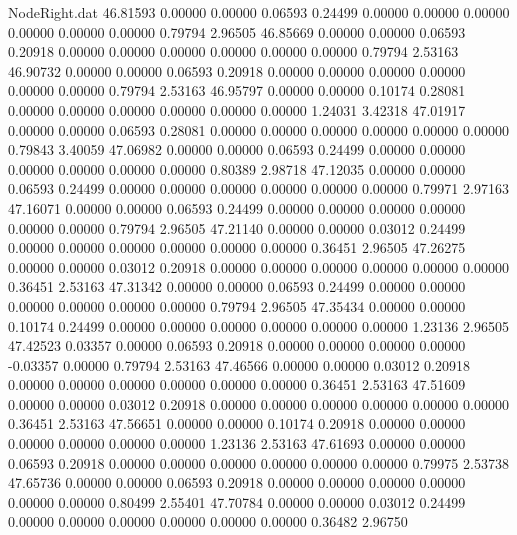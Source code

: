 \begin{filecontents}{NodeRight.dat}
  46.81593    0.00000    0.00000     0.06593    0.24499    0.00000    0.00000    0.00000    0.00000    0.00000    0.00000    0.79794    2.96505
  46.85669    0.00000    0.00000     0.06593    0.20918    0.00000    0.00000    0.00000    0.00000    0.00000    0.00000    0.79794    2.53163
  46.90732    0.00000    0.00000     0.06593    0.20918    0.00000    0.00000    0.00000    0.00000    0.00000    0.00000    0.79794    2.53163
  46.95797    0.00000    0.00000     0.10174    0.28081    0.00000    0.00000    0.00000    0.00000    0.00000    0.00000    1.24031    3.42318
  47.01917    0.00000    0.00000     0.06593    0.28081    0.00000    0.00000    0.00000    0.00000    0.00000    0.00000    0.79843    3.40059
  47.06982    0.00000    0.00000     0.06593    0.24499    0.00000    0.00000    0.00000    0.00000    0.00000    0.00000    0.80389    2.98718
  47.12035    0.00000    0.00000     0.06593    0.24499    0.00000    0.00000    0.00000    0.00000    0.00000    0.00000    0.79971    2.97163
  47.16071    0.00000    0.00000     0.06593    0.24499    0.00000    0.00000    0.00000    0.00000    0.00000    0.00000    0.79794    2.96505
  47.21140    0.00000    0.00000     0.03012    0.24499    0.00000    0.00000    0.00000    0.00000    0.00000    0.00000    0.36451    2.96505
  47.26275    0.00000    0.00000     0.03012    0.20918    0.00000    0.00000    0.00000    0.00000    0.00000    0.00000    0.36451    2.53163
  47.31342    0.00000    0.00000     0.06593    0.24499    0.00000    0.00000    0.00000    0.00000    0.00000    0.00000    0.79794    2.96505
  47.35434    0.00000    0.00000     0.10174    0.24499    0.00000    0.00000    0.00000    0.00000    0.00000    0.00000    1.23136    2.96505
  47.42523    0.03357    0.00000     0.06593    0.20918    0.00000    0.00000    0.00000    0.00000   -0.03357    0.00000    0.79794    2.53163
  47.46566    0.00000    0.00000     0.03012    0.20918    0.00000    0.00000    0.00000    0.00000    0.00000    0.00000    0.36451    2.53163
  47.51609    0.00000    0.00000     0.03012    0.20918    0.00000    0.00000    0.00000    0.00000    0.00000    0.00000    0.36451    2.53163
  47.56651    0.00000    0.00000     0.10174    0.20918    0.00000    0.00000    0.00000    0.00000    0.00000    0.00000    1.23136    2.53163
  47.61693    0.00000    0.00000     0.06593    0.20918    0.00000    0.00000    0.00000    0.00000    0.00000    0.00000    0.79975    2.53738
  47.65736    0.00000    0.00000     0.06593    0.20918    0.00000    0.00000    0.00000    0.00000    0.00000    0.00000    0.80499    2.55401
  47.70784    0.00000    0.00000     0.03012    0.24499    0.00000    0.00000    0.00000    0.00000    0.00000    0.00000    0.36482    2.96750

\end{filecontents}
